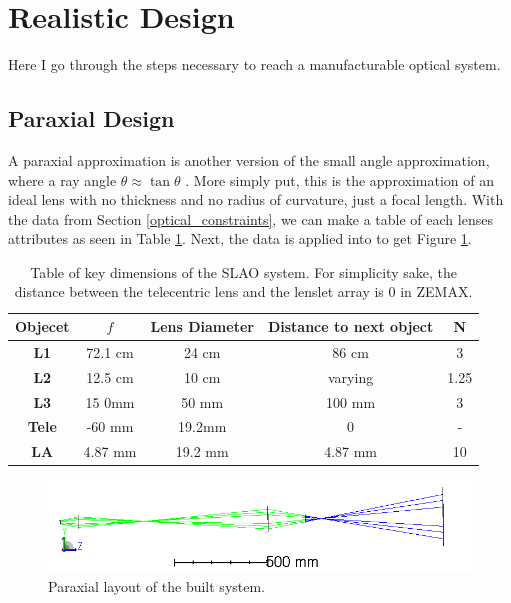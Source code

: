\section{Realistic Design}
\label{sec:reality}

Here I go through the steps necessary to reach a manufacturable optical system.

\subsection{Paraxial Design}
\label{sec:real_paraxial}

A paraxial approximation is another version of the small angle approximation, where
a ray angle $\theta \approx \tan \theta$ \cite{greivenkamp_2004}.  More simply put,
this is the approximation of an ideal lens with no thickness and no radius of
curvature, just a focal length.  With the data from Section
\ref{optical_constraints}, we can make a table of each lenses attributes as seen in
Table \ref{tab:lens_data}.  Next, the data is applied into to get Figure
\ref{fig:paraxial_layout}.


\begin{table}[h!]
\begin{tabular}{|c|c|c|c|c|}
\hline
\textbf{Objecet} & \textbf{$f$} & \textbf{Lens Diameter} & \textbf{Distance to next object} & \textbf{N} \\ \hline
\textbf{L1}      & 72.1 cm      & 24 cm                  & 86 cm                            & 3          \\ \hline
\textbf{L2}      & 12.5 cm      & 10 cm                  & varying                          & 1.25       \\ \hline
\textbf{L3}      & 15 0mm        & 50 mm                   & 100 mm                            & 3          \\ \hline
\textbf{Tele}    & -60 mm        & 19.2mm                 & 0                                & -          \\ \hline
\textbf{LA}      & 4.87 mm       & 19.2 mm                 & 4.87 mm                           & 10         \\ \hline
\end{tabular}
\caption{Table of key dimensions of the SLAO system.  For simplicity sake, the distance between the telecentric lens and the lenslet array is 0 in ZEMAX.}
\label{tab:lens_data}
\end{table}

\begin{figure}[h!]
\centering
\includegraphics[width=14 cm]{Figures/paraxial_layout.png}
\caption{Paraxial layout of the built system.}
\label{fig:paraxial_layout}
\end{figure}

